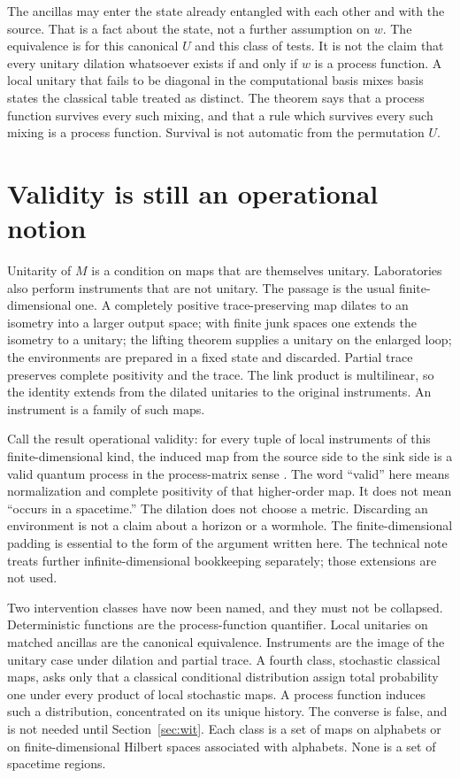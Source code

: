 \documentclass[11pt]{article}
\begin{document}
The ancillas may enter the state already entangled with each other and with the source. That is a fact about the state, not a further assumption on \(w\). The equivalence is for this canonical \(U\) and this class of tests. It is not the claim that every unitary dilation whatsoever exists if and only if \(w\) is a process function. A local unitary that fails to be diagonal in the computational basis mixes basis states the classical table treated as distinct. The theorem says that a process function survives every such mixing, and that a rule which survives every such mixing is a process function. Survival is not automatic from the permutation \(U\).

\section{Validity is still an operational notion}
\label{sec:val}

Unitarity of \(M\) is a condition on maps that are themselves unitary. Laboratories also perform instruments that are not unitary. The passage is the usual finite-dimensional one. A completely positive trace-preserving map dilates to an isometry into a larger output space; with finite junk spaces one extends the isometry to a unitary; the lifting theorem supplies a unitary on the enlarged loop; the environments are prepared in a fixed state and discarded. Partial trace preserves complete positivity and the trace. The link product is multilinear, so the identity extends from the dilated unitaries to the original instruments. An instrument is a family of such maps.

Call the result operational validity: for every tuple of local instruments of this finite-dimensional kind, the induced map from the source side to the sink side is a valid quantum process in the process-matrix sense \citep{oreshkov2012,araujo2017}. The word ``valid'' here means normalization and complete positivity of that higher-order map. It does not mean ``occurs in a spacetime.'' The dilation does not choose a metric. Discarding an environment is not a claim about a horizon or a wormhole. The finite-dimensional padding is essential to the form of the argument written here. The technical note treats further infinite-dimensional bookkeeping separately; those extensions are not used.

Two intervention classes have now been named, and they must not be collapsed. Deterministic functions are the process-function quantifier. Local unitaries on matched ancillas are the canonical equivalence. Instruments are the image of the unitary case under dilation and partial trace. A fourth class, stochastic classical maps, asks only that a classical conditional distribution assign total probability one under every product of local stochastic maps. A process function induces such a distribution, concentrated on its unique history. The converse is false, and is not needed until Section~\ref{sec:wit}. Each class is a set of maps on alphabets or on finite-dimensional Hilbert spaces associated with alphabets. None is a set of spacetime regions.
\end{document}
